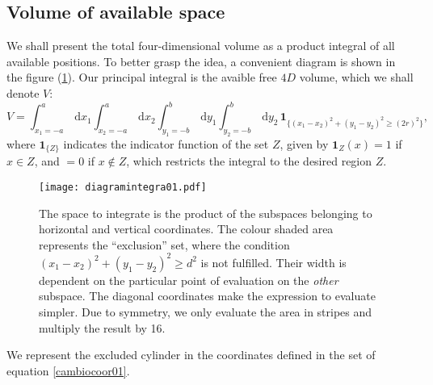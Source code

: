 \documentclass[a4paper,10pt, jcp, aps, preprint]{revtex4-1}
\newcommand{\rd}{\, \mathrm{d}}
\newcommand{\indicator}[1]{\mathbf{1}_{ \{   #1 \} } }
\begin{document}
\subsection{Volume of available space}

We shall present the total four-dimensional volume as a product integral
of all available positions. To better grasp the idea, a convenient
diagram is shown in the figure (\ref{diagintegra01}). Our
principal integral is the avaible free $4D$ volume, which 
we shall denote $V$:
\begin{equation}\label{volindic}
 V = \int_{x_1 = -a}^a \rd x_1 \int_{x_2 = -a}^a \rd x_2 
\int_{y_1 = -b}^b \rd y_1 \int_{y_2 = -b}^b \rd y_2 \, \indicator{ (x_1-x_2)^2 + (y_1-y_2)^2 \ge (2r)^2 },
\end{equation}
where $\indicator{Z}$ indicates the indicator function of the set $Z$, 
given by $\mathbf{1}_Z (x) = 1$ if $x \in Z$, and $=0$ if $x \notin Z$, 
which restricts the integral to the desired region $Z$.

\begin{figure}[h]
  \begin{center}
    \texttt{[image: diagramintegra01.pdf]}
    \caption{The space to integrate is the product of the subspaces
      belonging to horizontal and vertical coordinates. The colour
      shaded area represents the ``exclusion'' set, where the condition 
      $ (x_1-x_2)^2 + (y_1-y_2)^2 \ge d^2 $ is not fulfilled. 
      Their width is dependent on the particular point of evaluation
      on the \emph{other} subspace. The diagonal coordinates
      make the expression to evaluate simpler. Due to 
      symmetry, we only evaluate the area in stripes and
      multiply the result by 16.}\label{diagintegra01}
  \end{center}
\end{figure}

We represent the excluded cylinder in the coordinates defined in 
the set of equation \ref{cambiocoor01}. 
\end{document}
